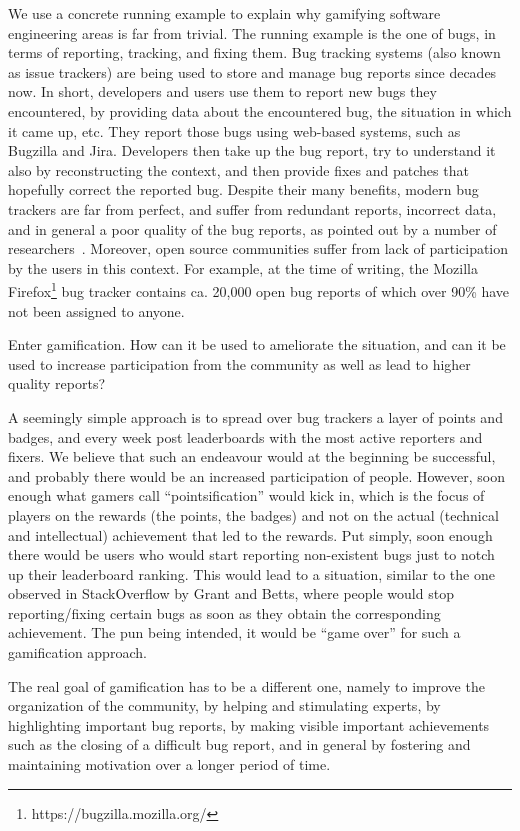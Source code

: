 We use a concrete running example to explain why gamifying software engineering areas is far from trivial.
The running example is the one of bugs, in terms of reporting, tracking, and fixing them.
Bug tracking systems (also known as issue trackers) are being used to store and manage bug reports since decades now.
In short, developers and users use them to report new bugs they encountered, by providing data about the encountered bug, the situation in which it came up, etc.
They report those bugs using web-based systems, such as Bugzilla and Jira.
Developers then take up the bug report, try to understand it also by reconstructing the context, and then provide fixes and patches that hopefully correct the reported bug.
Despite their many benefits, modern bug trackers are far from perfect, and suffer from redundant reports, incorrect data, and in general a poor quality of the bug reports, as pointed out by a number of researchers~\cite{Bird2009a,Zimm2010a}.
Moreover, open source communities suffer from lack of participation by the users in this context.
For example, at the time of writing, the Mozilla Firefox\footnote{https://bugzilla.mozilla.org/} bug tracker contains ca.
20,000 open bug reports of which over 90\% have not been assigned to anyone.

Enter gamification.
How can it be used to ameliorate the situation, and can it be used to increase participation from the community as well as lead to higher quality reports?

A seemingly simple approach is to spread over bug trackers a layer of points and badges, and every week post leaderboards with the most active reporters and fixers.
We believe that such an endeavour would at the beginning be successful, and probably there would be an increased participation of people.
However, soon enough what gamers call ``pointsification'' would kick in, which is the focus of players on the rewards (the points, the badges) and not on the actual (technical and intellectual) achievement that led to the rewards.
Put simply, soon enough there would be users who would start reporting non-existent bugs just to notch up their leaderboard ranking.
This would lead to a situation, similar to the one observed in StackOverflow by Grant and Betts, where people would stop reporting/fixing certain bugs as soon as they obtain the corresponding achievement.
The pun being intended, it would be ``game over'' for such a gamification approach.

The real goal of gamification has to be a different one, namely to improve the organization of the community, by helping and stimulating experts, by highlighting important bug reports, by making visible important achievements such as the closing of a difficult bug report, and in general by fostering and maintaining motivation over a longer period of time.

